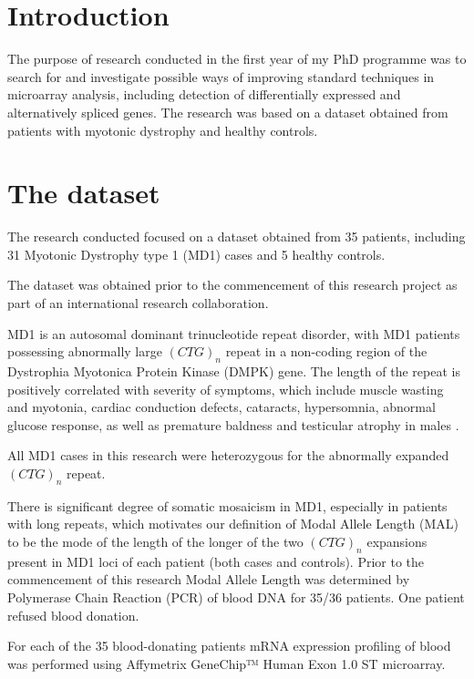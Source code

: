 
\section{Introduction}

The purpose of research conducted in the first year of my PhD programme was to search for and investigate possible ways of improving standard techniques in microarray analysis, including detection of differentially expressed and alternatively spliced genes. The research was based on a dataset obtained from patients with myotonic dystrophy and healthy controls. 

\section{The dataset} \label{chapter_dataset}

The research conducted  focused on a dataset obtained from 35 patients, including 31 Myotonic Dystrophy type 1 (MD1) cases and 5 healthy controls.

The dataset was obtained prior to the commencement of this research project as part of an international research collaboration.

MD1 is an autosomal dominant trinucleotide repeat disorder, with MD1 patients possessing abnormally large $(CTG)_n$ repeat in a non-coding region of the Dystrophia Myotonica Protein Kinase (DMPK) gene. The length of the repeat is positively correlated with severity of symptoms, which include muscle wasting and myotonia, cardiac conduction defects, cataracts, hypersomnia, abnormal glucose response, as well as premature baldness and testicular atrophy in males \parencite{Brook1992}.

All MD1 cases in this research were heterozygous for the abnormally expanded $(CTG)_n$ repeat.

There is significant degree of somatic mosaicism in MD1, especially in patients with long repeats, which motivates our definition of Modal Allele Length (MAL) to be the mode of the length of the longer of the two $(CTG)_n$ expansions present in MD1 loci of each patient (both cases and controls). Prior to the commencement of this research Modal Allele Length was determined by Polymerase Chain Reaction (PCR) of blood DNA for 35/36 patients. One patient refused blood donation.

For each of the 35 blood-donating patients mRNA expression profiling of blood was performed using Affymetrix GeneChip™ Human Exon 1.0 ST microarray.

